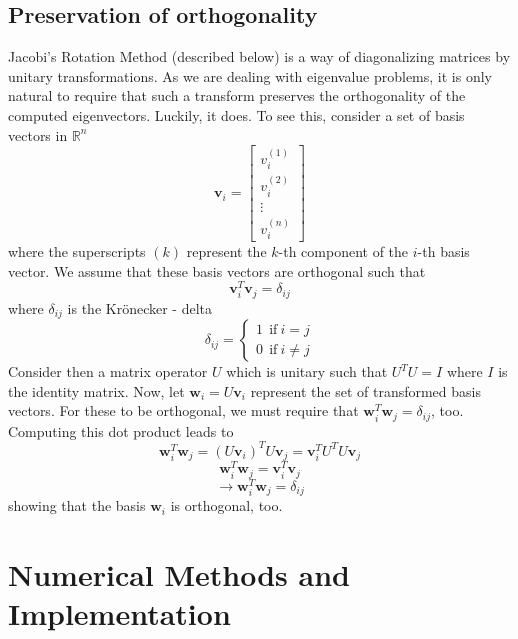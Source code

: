 	\subsection{Preservation of orthogonality}
	Jacobi's Rotation Method (described below) is a way of diagonalizing matrices by unitary transformations. As we are dealing with eigenvalue problems, it is only natural to require that such a transform preserves the orthogonality of the computed eigenvectors. Luckily, it does. To see this, consider a set of basis vectors in $\mathbb{R}^n$
	\[ \mathbf{v}_i = 
	\begin{bmatrix}
	v^{(1)}_{i}\\
	v^{(2)}_i\\
	\vdots\\
	v^{(n)}_i
	\end{bmatrix}
	\]
	where the superscripts $(k)$ represent the $k$-th component of the $i$-th basis vector. We assume that these basis vectors are orthogonal such that
	\[
	\mathbf{v}^T_i\mathbf{v}_j = \delta_{ij} 
	\]
	where $\delta_{ij}$ is the Krönecker - delta
	\[
	\delta_{ij} = 
	\begin{cases}
	1 \ \ \text{if} \ i = j\\
	0 \ \ \text{if} \ i \neq j
	\end{cases}
	\]
	Consider then a matrix operator $U$ which is unitary such that $U^TU = I$ where $I$ is the identity matrix. Now, let $\mathbf{w}_i = U\mathbf{v}_i$ represent the set of transformed basis vectors. For these to be orthogonal, we must require that $\mathbf{w}^T_i\mathbf{w}_j = \delta_{ij}$, too. Computing this dot product leads to
	\[
	\mathbf{w}^T_i\mathbf{w}_j = \left(U\mathbf{v}_i\right)^TU\mathbf{v}_j = \mathbf{v}^T_iU^TU\mathbf{v}_j
	\]
	\[
	\mathbf{w}^T_i\mathbf{w}_j = \mathbf{v}^T_i\mathbf{v}_j
	\]
	\[
	\to \mathbf{w}^T_i\mathbf{w}_j = \delta_{ij}
	\]
	showing that the basis $\mathbf{w}_i$ is orthogonal, too.  
	\section{Numerical Methods and Implementation}

